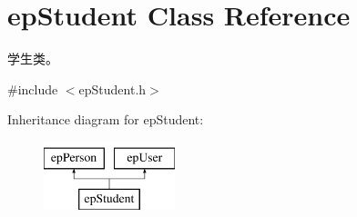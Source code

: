 \hypertarget{classepStudent}{\section{ep\-Student \-Class \-Reference}
\label{classepStudent}
}


学生类。  




{\ttfamily \#include $<$ep\-Student.\-h$>$}

\-Inheritance diagram for ep\-Student\-:\begin{figure}[H]
\begin{center}
\leavevmode
\includegraphics[height=2.000000cm]{classepStudent}
\end{center}
\end{figure}
